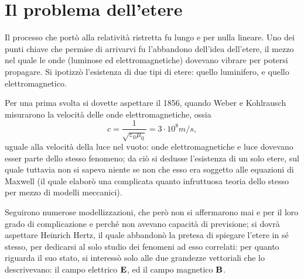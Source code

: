 \chapter{Il problema dell'etere}
Il processo che port\`o alla relativit\`a ristretta fu lungo e per
nulla lineare. Uno dei punti chiave che permise di arrivarvi fu
l'abbandono dell'idea dell'etere, il mezzo nel quale le onde (luminose
ed elettromagnetiche) dovevano vibrare per potersi propagare. Si
ipotizz\`o l'esistenza di due tipi di etere: quello luminifero, e
quello elettromagnetico.

Per una prima svolta si dovette aspettare il 1856, quando Weber e
Kohlrausch misurarono la velocit\`a delle onde elettromagnetiche,
ossia
\begin{equation}
  c = \frac{1}{\sqrt{\varepsilon_0 \mu_0}} = 3 \cdot 10^8 m / s,
\end{equation}
uguale alla velocit\`a della luce nel vuoto: onde elettromagnetiche e
luce dovevano esser parte dello stesso fenomeno; da ci\`o si dedusse
l'esistenza di un solo etere, sul quale tuttavia non si sapeva niente
se non che esso era soggetto alle equazioni di Maxwell (il quale
elabor\`o una complicata quanto infruttuosa teoria dello stesso per
mezzo di modelli meccanici).

Seguirono numerose modellizzazioni, che per\`o non si affermarono mai
e per il loro grado di complicazione e perch\'e non avevano capacit\`a
di previsione; si dovr\`a aspettare Heinrich Hertz, il quale
abbandon\`o la pretesa di spiegare l'etere in s\'e stesso, per
dedicarsi al solo studio dei fenomeni ad esso correlati: per quanto
riguarda il suo stato, si interess\`o solo alle due grandezze vettoriali
che lo descrivevano: il campo elettrico $\mathbf{E}$, ed il campo magnetico
$\mathbf{B}$.

